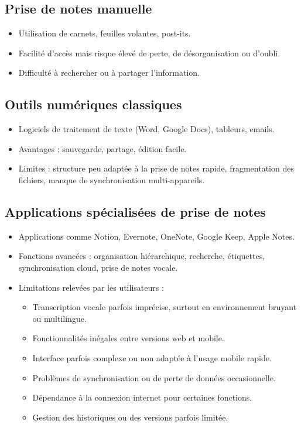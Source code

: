 \subsection{Prise de notes manuelle}
\begin{itemize}
    \item Utilisation de carnets, feuilles volantes, post-its.
    \item Facilité d’accès mais risque élevé de perte, de désorganisation ou d’oubli.
    \item Difficulté à rechercher ou à partager l’information.
\end{itemize}

\subsection{Outils numériques classiques}
\begin{itemize}
    \item Logiciels de traitement de texte (Word, Google Docs), tableurs, emails.
    \item Avantages : sauvegarde, partage, édition facile.
    \item Limites : structure peu adaptée à la prise de notes rapide, fragmentation des fichiers, manque de synchronisation multi-appareils.
\end{itemize}

\subsection{Applications spécialisées de prise de notes}
\begin{itemize}
    \item Applications comme Notion, Evernote, OneNote, Google Keep, Apple Notes.
    \item Fonctions avancées : organisation hiérarchique, recherche, étiquettes, synchronisation cloud, prise de notes vocale.
    \item Limitations relevées par les utilisateurs :
    \begin{itemize}
        \item Transcription vocale parfois imprécise, surtout en environnement bruyant ou multilingue.
        \item Fonctionnalités inégales entre versions web et mobile.
        \item Interface parfois complexe ou non adaptée à l’usage mobile rapide.
        \item Problèmes de synchronisation ou de perte de données occasionnelle.
        \item Dépendance à la connexion internet pour certaines fonctions.
        \item Gestion des historiques ou des versions parfois limitée.
    \end{itemize}
\end{itemize}

